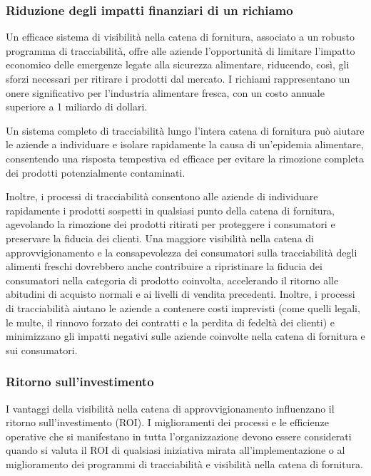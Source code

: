 \subsubsection{Riduzione degli impatti finanziari di un richiamo}

Un efficace sistema di visibilità nella catena di fornitura, associato a un robusto programma di tracciabilità, offre alle aziende l'opportunità di limitare l'impatto economico delle emergenze legate alla sicurezza alimentare, riducendo, così, gli sforzi necessari per ritirare i prodotti dal mercato. I richiami rappresentano un onere significativo per l'industria alimentare fresca, con un costo annuale superiore a 1 miliardo di dollari. 

Un sistema completo di tracciabilità lungo l'intera catena di fornitura può aiutare le aziende a individuare e isolare rapidamente la causa di un'epidemia alimentare, consentendo una risposta tempestiva ed efficace per evitare la rimozione completa dei prodotti potenzialmente contaminati. 

Inoltre, i processi di tracciabilità consentono alle aziende di individuare rapidamente i prodotti sospetti in qualsiasi punto della catena di fornitura, agevolando la rimozione dei prodotti ritirati per proteggere i consumatori e preservare la fiducia dei clienti. Una maggiore visibilità nella catena di approvvigionamento e la consapevolezza dei consumatori sulla tracciabilità degli alimenti freschi dovrebbero anche contribuire a ripristinare la fiducia dei consumatori nella categoria di prodotto coinvolta, accelerando il ritorno alle abitudini di acquisto normali e ai livelli di vendita precedenti. Inoltre, i processi di tracciabilità aiutano le aziende a contenere costi imprevisti (come quelli legali, le multe, il rinnovo forzato dei contratti e la perdita di fedeltà dei clienti) e minimizzano gli impatti negativi sulle aziende coinvolte nella catena di fornitura e sui consumatori.

\subsubsection{Ritorno sull'investimento}

I vantaggi della visibilità nella catena di approvvigionamento influenzano il ritorno sull'investimento (ROI). I miglioramenti dei processi e le efficienze operative che si manifestano in tutta l'organizzazione devono essere considerati quando si valuta il ROI di qualsiasi iniziativa mirata all'implementazione o al miglioramento dei programmi di tracciabilità e visibilità nella catena di fornitura.

